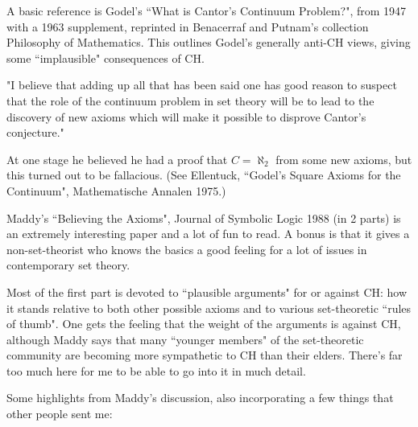 


A basic reference is Godel's ``What is Cantor's Continuum Problem?", from
1947 with a 1963 supplement, reprinted in Benacerraf and Putnam's collection
Philosophy of Mathematics.  This outlines Godel's generally anti-CH views,
giving some ``implausible" consequences of CH.

  "I believe that adding up all that has been said one has good reason
   to suspect that the role of the continuum problem in set theory will
   be to lead to the discovery of new axioms which will make it possible
   to disprove Cantor's conjecture."

At one stage he believed he had a proof that $C = \aleph_2$ from some new
axioms, but this turned out to be fallacious.  (See Ellentuck, ``Godel's
Square Axioms for the Continuum", Mathematische Annalen 1975.)

Maddy's  ``Believing the Axioms",
Journal of Symbolic Logic 1988 (in 2 parts) is an extremely
interesting paper and a lot of fun to read.  A bonus is that it gives
a non-set-theorist who knows the basics a good feeling for a lot of
issues in contemporary set theory.

Most of the first part is devoted to ``plausible arguments" for or against
CH: how it stands relative to both other possible axioms and to various
set-theoretic ``rules of thumb".  One gets the feeling that the weight of
the arguments is against CH, although Maddy says that many ``younger members"
of the set-theoretic community are becoming more sympathetic to CH than
their elders.  There's far too much here for me to be able to go into it
in much detail.

Some highlights from Maddy's discussion, also incorporating a few things that
other people sent me:

